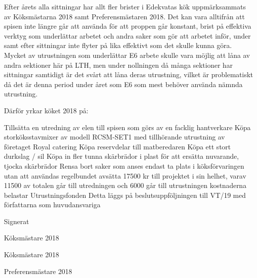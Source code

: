 \documentclass[../_main/handlingar.tex]{subfiles}
\begin{document}
Efter årets alla sittningar har allt fler brister i Edekvatas kök uppmärksammats av
Köksmästarna 2018 samt Preferensmästaren 2018. Det kan vara alltifrån att spisen inte
längre går att använda för att proppen går konstant, brist på effektiva verktyg som
underlättar arbetet och andra saker som gör att arbetet inför, under samt efter sittningar inte
flyter på lika effektivt som det skulle kunna göra.
Mycket av utrustningen som underlättar E6 arbete skulle vara möjlig att låna av andra
sektioner här på LTH, men under nollningen då många sektioner har sittningar samtidigt är
det svårt att låna deras utrustning, vilket är problematiskt då det är denna period under året
som E6 som mest behöver använda nämnda utrustning.

Därför yrkar köket 2018 på:

\begin{attsatser}
\att Tillsätta en utredning av elen till spisen som görs av en facklig hantverkare
\att Köpa storköksstavmixer av modell RCSM-SET1 med tillhörande utrustning av företaget
Royal catering
\att Köpa reservdelar till matberedaren
\att Köpa ett stort durkslag / sil
\att Köpa in fler tunna skärbrädor i plast för att ersätta nuvarande, tjocka skärbrädor
\att Rensa bort saker som anses endast ta plats i köksförvaringen utan att användas
regelbundet
\att avsätta 17500 kr till projektet i sin helhet, varav 11500 av totalen går till utredningen och
6000 går till utrustningen
\att kostnaderna belastar Utrustningsfonden
\att Detta läggs på beslutsuppföljningen till VT/19 med författarna som huvudansvariga
\end{attsatser}
\begin{signatures}{3}
    Signerat
    \signature{Fredrik Berg}{Köksmästare 2018}
    \signature{Filip Larsson}{Köksmästare 2018}
    \signature{Y Nhi Pham}{Preferensmästare 2018}

\end{signatures}
\end{document}
